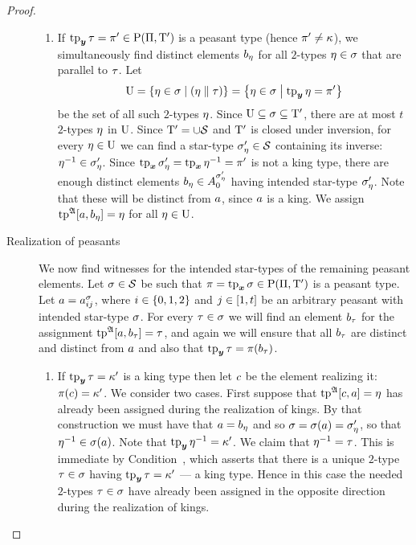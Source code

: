 \begin{proof}
\begin{description}
\begin{enumerate}
  \item If $\operatorname{tp}_{\bm{y}}\tau = {\pi'} \in \mathrm{P}(\Pi,{\mathrm{T}'})$ is a peasant type (hence
  ${\pi'} \neq \kappa$), we simultaneously find distinct elements $b_{\eta}$
  for all $2$-types $\eta \in \sigma$ that are parallel to $\tau$.
  Let
  \[
    \mathrm{U} = \left\{\eta \in \sigma\mathrel{}\middle|\mathrel{}(\eta \parallel \tau)\right\} = 
    \left\{\eta\in \sigma\mathrel{}\middle|\mathrel{}\operatorname{tp}_{\bm{y}}\eta = {\pi'}\right\}
  \] be the set of all such $2$-types $\eta$.
  Since $\mathrm{U} \subseteq \sigma \subseteq {\mathrm{T}'}$, there are
  at most $t$ $2$-types $\eta$ in $\mathrm{U}$. Since ${\mathrm{T}'} = \cup\mathcal{S}$ and
  ${\mathrm{T}'}$ is closed under inversion, for every $\eta \in \mathrm{U}$
  we can find a star-type ${\sigma_{\eta}'} \in \mathcal{S}$ containing its inverse:
  $\eta^{-1} \in {\sigma_{\eta}'}$.
  Since $\operatorname{tp}_{\bm{x}}{\sigma_{\eta}'} = \operatorname{tp}_{\bm{x}}\eta^{-1} = {\pi'}$ is not a king type, there
  are enough distinct elements $b_{\eta} \in A^{{\sigma_{\eta}'}}_{0}$ having
  intended star-type ${\sigma_{\eta}'}$. Note that these will be distinct from
  $a$, since $a$ is a king.
  We assign $\operatorname{tp}^{\mathfrak{A}}[a,b_{\eta}] = \eta$ for all $\eta \in \mathrm{U}$.
  \end{enumerate}
  \item[Realization of peasants] We now find witnesses for the intended
  star-types of the remaining peasant elements.
  Let $\sigma \in \mathcal{S}$ be such that $\pi = \operatorname{tp}_{\bm{x}}\sigma \in \mathrm{P}(\Pi,{\mathrm{T}'})$ is
  a peasant type. Let $a = a^{\sigma}_{i j}$, where $i \in \left\{0,1,2\right\}$ and
  $j \in [1,t]$ be an arbitrary peasant with intended star-type $\sigma$.
  For every $\tau \in \sigma$ we will find an element $b_\tau$ for the
  assignment $\operatorname{tp}^{\mathfrak{A}}[a,b_\tau] = \tau$, and again we will ensure that
  all $b_{\tau}$ are distinct and distinct from $a$ and also that $\operatorname{tp}_{\bm{y}}\tau
  = \pi(b_{\tau})$.
  \begin{enumerate}
    \item If $\operatorname{tp}_{\bm{y}}\tau = {\kappa'}$ is a king type then let $c$ be the
    element realizing it: $\pi(c) = {\kappa'}$.
    We consider two cases.
    First suppose that $\operatorname{tp}^{\mathfrak{A}}[c,a] = \eta$ has already been assigned
    during the realization of kings.
    By that construction we must have that $a = b_{\eta}$ and so
    $\sigma = \sigma(a) = {\sigma_{\eta}'}$, so that $\eta^{-1} \in
    \sigma(a)$. Note that $\operatorname{tp}_{\bm{y}}\eta^{-1} = {\kappa'}$.
    We claim that $\eta^{-1} = \tau$. This is immediate by
    Condition~, which asserts that there is a unique $2$-type
    $\tau \in \sigma$ having $\operatorname{tp}_{\bm{y}}\tau = {\kappa'}$ --- a king type.
    Hence in this case the needed $2$-types $\tau \in \sigma$ have already been
    assigned in the opposite direction during the realization of kings.
    

\end{enumerate}
\end{description}
\end{proof}

